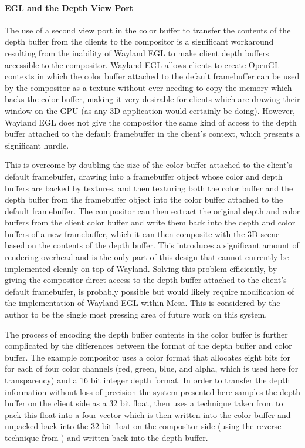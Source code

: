 \paragraph{EGL and the Depth View Port}
\label{sec:depth-viewport}

The use of a second view port in the color buffer to transfer the contents of the depth buffer from the clients to the compositor is a significant workaround resulting from the inability of Wayland EGL to make client depth buffers accessible to the compositor. Wayland EGL allows clients to create OpenGL contexts in which the color buffer attached to the default framebuffer can be used by the compositor as a texture without ever needing to copy the memory which backs the color buffer, making it very desirable for clients which are drawing their window on the GPU (as any 3D application would certainly be doing). However, Wayland EGL does not give the compositor the same kind of access to the depth buffer attached to the default framebuffer in the client's context, which presents a significant hurdle. 
	
This is overcome by doubling the size of the color buffer attached to the client's default framebuffer, drawing into a framebuffer object whose color and depth buffers are backed by textures, and then texturing both the color buffer and the depth buffer from the framebuffer object into the color buffer attached to the default framebuffer. The compositor can then extract the original depth and color buffers from the client color buffer and write them back into the depth and color buffers of a new framebuffer, which it can then composite with the 3D scene based on the contents of the depth buffer. This introduces a significant amount of rendering overhead and is the only part of this design that cannot currently be implemented cleanly on top of Wayland. Solving this problem efficiently, by giving the compositor direct access to the depth buffer attached to the client's default framebuffer, is probably possible but would likely require modification of the implementation of Wayland EGL within Mesa. This is considered by the author to be the single most pressing area of future work on this system.

The process of encoding the depth buffer contents in the color buffer is further complicated by the differences between the format of the depth buffer and color buffer. The example compositor uses a color format that allocates eight bits for for each of four color channels (red, green, blue, and alpha, which is used here for transparency) and a 16 bit integer depth format. In order to transfer the depth information without loss of precision the system presented here samples the depth buffer on the client side as a 32 bit float, then uses a technique taken from \cite{pack-float-rgba} to pack this float into a four-vector which is then written into the color buffer and unpacked back into the 32 bit float on the compositor side (using the reverse technique from \cite{pack-float-rgba}) and written back into the depth buffer. 

